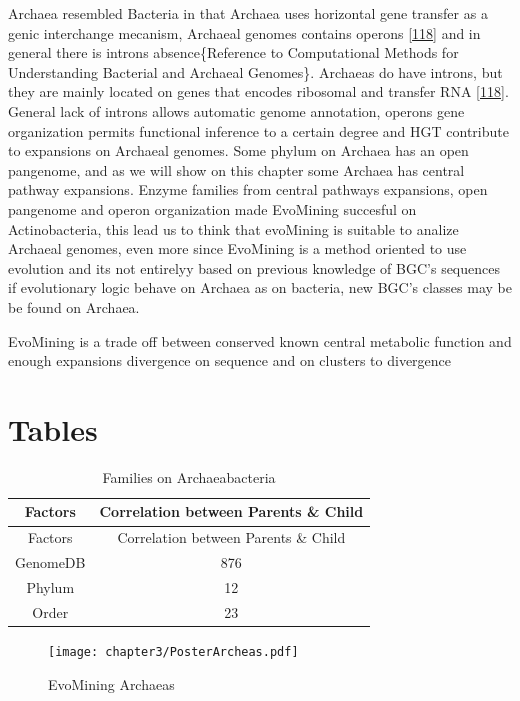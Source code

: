 \documentclass[12pt,twoside]{reedthesis}
\begin{document}
  Archaea resembled Bacteria in that Archaea uses horizontal gene transfer
  as a genic interchange mecanism, Archaeal genomes contains operons
  {[}\protect\hyperlink{ref-howlandux5fsurprisingux5f2000}{118}{]} and in
  general there is introns absence\{Reference to Computational Methods for
  Understanding Bacterial and Archaeal Genomes\}. Archaeas do have
  introns, but they are mainly located on genes that encodes ribosomal and
  transfer RNA
  {[}\protect\hyperlink{ref-howlandux5fsurprisingux5f2000}{118}{]}.
  General lack of introns allows automatic genome annotation, operons gene
  organization permits functional inference to a certain degree and HGT
  contribute to expansions on Archaeal genomes. Some phylum on Archaea has
  an open pangenome, and as we will show on this chapter some Archaea has
  central pathway expansions. Enzyme families from central pathways
  expansions, open pangenome and operon organization made EvoMining
  succesful on Actinobacteria, this lead us to think that evoMining is
  suitable to analize Archaeal genomes, even more since EvoMining is a
  method oriented to use evolution and its not entirelyy based on previous
  knowledge of BGC's sequences if evolutionary logic behave on Archaea as
  on bacteria, new BGC's classes may be be found on Archaea.
  
  EvoMining is a trade off between conserved known central metabolic
  function and enough expansions divergence on sequence and on clusters to
  divergence
  
  \section{Tables}\label{tables}
  
  \begin{longtable}[c]{@{}cc@{}}
  \caption{Families on Archaeabacteria \label{tab:inher}}\tabularnewline
  \toprule
  Factors & Correlation between Parents \& Child\tabularnewline
  \midrule
  \endfirsthead
  \toprule
  Factors & Correlation between Parents \& Child\tabularnewline
  \midrule
  \endhead
  GenomeDB & 876\tabularnewline
  Phylum & 12\tabularnewline
  Order & 23\tabularnewline
  \bottomrule
  \end{longtable}
  
  \clearpage
  
  \begin{figure}[h!tbp]
  \centering
  \texttt{[image: chapter3/PosterArcheas.pdf]}
  \caption[EvoMining Archaeas]{\normalsize{EvoMining Archaeas}}
  \label{fig:EvoMining Archaeas}
  \end{figure}
  
\end{document}
